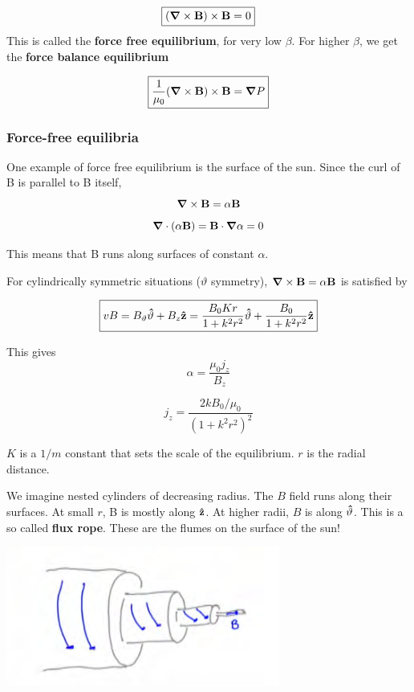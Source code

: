 \documentclass[PlasmaNotes.tex]{subfiles}
\begin{document}
\begin{equation}
\boxed{\mathbf{(\mbox{\boldmath$ \nabla $} \times \mathbf{B})} \times \mathbf{B} = 0}
\end{equation}
This is called the \textbf{force free equilibrium}, for very low $\beta$. For higher $\beta$, we get the \textbf{force balance equilibrium}

\begin{equation}
\boxed{\frac{1}{\mu_0}\mathbf{(\mbox{\boldmath$ \nabla $} \times \mathbf{B})} \times \mathbf{B} = \mbox{\boldmath$ \nabla $} P}
\end{equation}

\subsubsection{Force-free equilibria}

One example of force free equilibrium is the surface of the sun. Since the curl of B is parallel to B itself,
\[\mbox{\boldmath$ \nabla $} \times \mathbf{B} = \alpha \mathbf{B} \]
\[\mbox{\boldmath$ \nabla $} \cdot \mathbf{(\alpha B)} = \mathbf{B} \cdot \mathbf{\mbox{\boldmath$ \nabla $} \alpha} = 0 \]

This means that B runs along surfaces of constant $\alpha$.

For cylindrically symmetric situations ($\vartheta$ symmetry), $\mbox{\boldmath$ \nabla $} \times \mathbf{B} = \alpha \mathbf{B}$ is satisfied by

\begin{equation}
\boxed{v{B} = B_{\vartheta} \mathbf{\hat{\vartheta}} + B_z \mathbf{\hat{z}} = \frac{B_0 K r}{1+k^2 r^2} \mathbf{\hat{\vartheta}} + \frac{B_0}{1+k^2 r^2} \mathbf{\hat{z}} }
\end{equation}


This gives
\[\alpha = \frac{\mu_0 j_z}{B_z}\]

\[j_z = \frac{2 k B_0/\mu_0}{(1+k^2 r^2)^2}\]


$K$ is a $1/m$ constant that sets the scale of the equilibrium. $r$ is the radial distance.

We imagine nested cylinders of decreasing radius. The $B$ field runs along their surfaces. At small $r$, B is mostly along $\mathbf{\hat{z}}$. At higher radii, $B$ is along $\mathbf{\hat{\vartheta}}$. This is a so called \textbf{flux rope}. These are the flumes on the surface of the sun!

\includegraphics{fluxrope}
\end{document}
